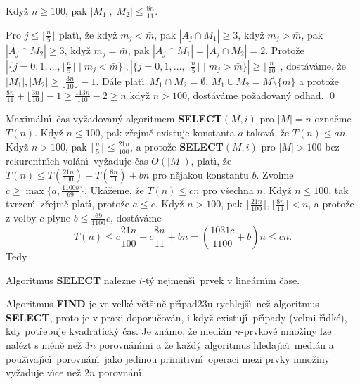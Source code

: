 Kdy\v z $n\ge 100$, pak $|M_1|,|M_2|\le\frac {8n}{
11}$.
\endproclaim

 Pro $j\le\lfloor\frac n5\rfloor$ plat\'\i , \v ze kdy\v z $
m_j<\bar {m}$, pak 
$|A_j\cap M_1|\ge 3$, kdy\v z $m_j>\bar {m}$, pak $|A_j\cap M_2|\ge 
3$, kdy\v z $m_j=\bar {m}$, 
pak $|A_j\cap M_1|=|A_j\cap M_2|=2$.  Proto\v ze 
$|\{j=0,1,\dots,\lfloor\frac n5\rfloor\mid m_j<\bar {m}\}|,|\{j=0
,1,\dots,\lfloor\frac n5\rfloor\mid m_j>\bar {m}\}|\ge\lfloor\frac 
n{10}\rfloor$, 
dost\'av\'ame, \v ze $|M_1|,|M_2|\ge\lfloor\frac {3n}{10}\rfloor 
-1$.  D\'ale plat\'\i\ $M_1\cap M_2=\emptyset$, 
$M_1\cup M_2=M\setminus \{\bar {m}\}$ a proto\v ze $\frac {8n}{11}
+\lfloor\frac {3n}{10}\rfloor -1\ge\frac {113n}{110}-2\ge n$ 
kdy\v z $n>100$, dost\'av\'ame po\v zadovan\'y odhad. \qed
\enddemo

\flushpar Maxim\'aln\'\i\ \v cas vy\v zadovan\'y algoritmem  
{\bf SELECT$(M,i)$} pro $|M|=n$ ozna\v cme $T(n)$.  Kdy\v z $n\le 
100$, pak z\v rejm\v e 
exis\-tuje konstanta $a$ takov\'a, \v ze $T(n)\le an$.  Kdy\v z $
n>100$, 
pak $\lceil\frac n5\rceil\le\frac {21n}{100}$, a proto\v ze {\bf SELECT$
(M,i)$} pro $|M|>100$ bez 
rekurentn\'\i ch vol\'an\'\i\ vy\v zaduje \v cas $O(|M|)$, plat\'\i , \v ze $
T(n)\le T(\frac {21n}{100})+T(\frac {8n}{11})+bn$ pro n\v ejakou konstantu 
$b$.  Zvolme $c\ge\max\{a,\frac {1100b}{69}\}$. Uk\'a\v zeme, \v ze $
T(n)\le cn$ pro 
v\v sechna $n$.  
Kdy\v z $n\le 100$, tak tvrzen\'\i\ z\v rejm\v e plat\'\i , proto\v ze $
a\le c$.  Kdy\v z 
$n>100$, pak $\lceil\frac {21n}{100}\rceil ,\lceil\frac {8n}{11}\rceil 
<n$, a proto\v ze z volby $c$ plyne 
$b\le\frac {69}{1100}c$, 
dost\'av\'ame 
$$T(n)\le c\frac {21n}{100}+c\frac {8n}{11}+bn=(\frac {1031c}{110
0}+b)n\le cn.$$
Tedy
\medskip

Algoritmus {\bf SELECT} nalezne $i$-t\'y nejmen\v s\'\i\ 
prvek v line\'arn\'\i m \v case.
\endproclaim
\medskip

\flushpar Algoritmus {\bf FIND} je ve velk\'e v\v et\v sin\v e 
p\v r\'\i pad\accent23u 
rychlej\v s\'\i\ ne\v z algoritmus {\bf SELECT}, proto je v praxi 
doporu\v cov\'an, i kdy\v z existuj\'\i\ 
p\v r\'\i pady (velmi \v r\'\i dk\'e), kdy pot\v rebuje kvadratick\'y \v cas.
Je zn\'amo, \v ze medi\'an $n$-prvkov\'e mno\v ziny lze nal\'ezt s 
m\'en\v e ne\v z $3n$ porovn\'an\'\i mi a \v ze ka\v zd\'y algoritmus hledaj\'\i c\'\i\ 
medi\'an a pou\v z\'\i vaj\'\i c\'\i\ porovn\'an\'\i\ jako jedinou primitivn\'\i\ 
operaci mezi prvky mno\v ziny vy\v zaduje v\'\i ce ne\v z $2n$ 
porovn\'an\'\i .
\bigskip

